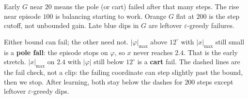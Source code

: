 Early $G$ near $20$ means the pole (or cart) failed after that many steps. The rise near episode $100$ is balancing starting to work. Orange $G$ flat at $200$ is the step cutoff, not unbounded gain. Late blue dips in $G$ are leftover $\varepsilon$-greedy failures.

Either bound can fail; the other need not. $|\varphi|_{\max}$ above $12^\circ$ with $|x|_{\max}$ still small is a \textbf{pole fall}: the episode stops on $\varphi$, so $x$ never reaches $2.4$. That is the early stretch. $|x|_{\max}$ on $2.4$ with $|\varphi|$ still below $12^\circ$ is a \textbf{cart} fail. The dashed lines are the fail check, not a clip: the failing coordinate can step slightly past the bound, then we stop. After learning, both stay below the dashes for $200$ steps except leftover $\varepsilon$-greedy dips.
